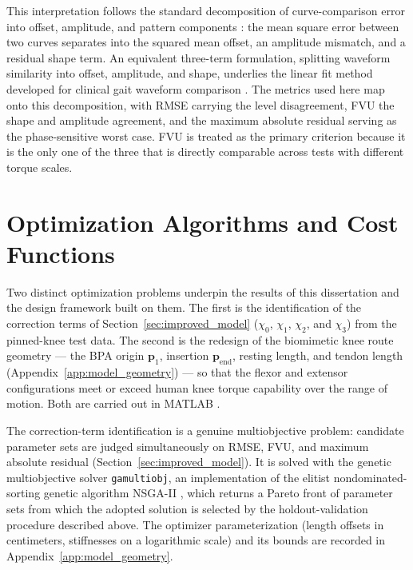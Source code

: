 This interpretation follows the standard decomposition of curve-comparison error into offset, amplitude, and pattern components \citep{taylor_summarizing_2001}: the mean square error between two curves separates into the squared mean offset, an amplitude mismatch, and a residual shape term. An equivalent three-term formulation, splitting waveform similarity into offset, amplitude, and shape, underlies the linear fit method developed for clinical gait waveform comparison \citep{iosa_assessment_2014}. The metrics used here map onto this decomposition, with RMSE carrying the level disagreement, FVU the shape and amplitude agreement, and the maximum absolute residual serving as the phase-sensitive worst case. FVU is treated as the primary criterion because it is the only one of the three that is directly comparable across tests with different torque scales.

\section{Optimization Algorithms and Cost Functions}\label{sec:optimization}

Two distinct optimization problems underpin the results of this dissertation and the design framework built on them. The first is the identification of the correction terms of Section~\ref{sec:improved_model} ($\chi_{0}$, $\chi_{1}$, $\chi_{2}$, and $\chi_{3}$) from the pinned-knee test data. The second is the redesign of the biomimetic knee route geometry --- the BPA origin $\mathbf{p}_{1}$, insertion $\mathbf{p}_{\text{end}}$, resting length, and tendon length (Appendix~\ref{app:model_geometry}) --- so that the flexor and extensor configurations meet or exceed human knee torque capability over the range of motion. Both are carried out in MATLAB \citep{mathworks_optimization_2025}.

The correction-term identification is a genuine multiobjective problem: candidate parameter sets are judged simultaneously on RMSE, FVU, and maximum absolute residual (Section~\ref{sec:improved_model}). It is solved with the genetic multiobjective solver \texttt{gamultiobj}, an implementation of the elitist nondominated-sorting genetic algorithm NSGA-II \citep{deb_nsga2_2002, mathworks_optimization_2025}, which returns a Pareto front of parameter sets from which the adopted solution is selected by the holdout-validation procedure described above. The optimizer parameterization (length offsets in centimeters, stiffnesses on a logarithmic scale) and its bounds are recorded in Appendix~\ref{app:model_geometry}.

